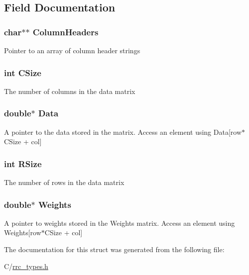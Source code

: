 \subsection{Field Documentation}
\hypertarget{struct_r_r_c_data_ab339159e5604808f92fe793f4f43da03}{
\subsubsection[{Column\-Headers}]{\setlength{\rightskip}{0pt plus 5cm}char$\ast$$\ast$ Column\-Headers}}\label{struct_r_r_c_data_ab339159e5604808f92fe793f4f43da03}
Pointer to an array of column header strings \hypertarget{struct_r_r_c_data_a17c9a5894aa9cb3789346dcaa9c370bb}{
\subsubsection[{C\-Size}]{\setlength{\rightskip}{0pt plus 5cm}int C\-Size}}\label{struct_r_r_c_data_a17c9a5894aa9cb3789346dcaa9c370bb}
The number of columns in the data matrix \hypertarget{struct_r_r_c_data_a7c5cbda3aa940f4b0d6e8a1679307dfc}{
\subsubsection[{Data}]{\setlength{\rightskip}{0pt plus 5cm}double$\ast$ Data}}\label{struct_r_r_c_data_a7c5cbda3aa940f4b0d6e8a1679307dfc}
A pointer to the data stored in the matrix. Access an element using Data\mbox{[}row$\ast$\-C\-Size + col\mbox{]} \hypertarget{struct_r_r_c_data_a4d8512c879223c0e0d1522dae38e7819}{
\subsubsection[{R\-Size}]{\setlength{\rightskip}{0pt plus 5cm}int R\-Size}}\label{struct_r_r_c_data_a4d8512c879223c0e0d1522dae38e7819}
The number of rows in the data matrix \hypertarget{struct_r_r_c_data_a557faafe2bb582e0c88078603aacb1c7}{
\subsubsection[{Weights}]{\setlength{\rightskip}{0pt plus 5cm}double$\ast$ Weights}}\label{struct_r_r_c_data_a557faafe2bb582e0c88078603aacb1c7}
A pointer to weights stored in the Weights matrix. Access an element using Weights\mbox{[}row$\ast$\-C\-Size + col\mbox{]} 

The documentation for this struct was generated from the following file\-:\begin{DoxyCompactItemize}
\item 
C/\hyperlink{rrc__types_8h}{rrc\-\_\-types.\-h}\end{DoxyCompactItemize}
